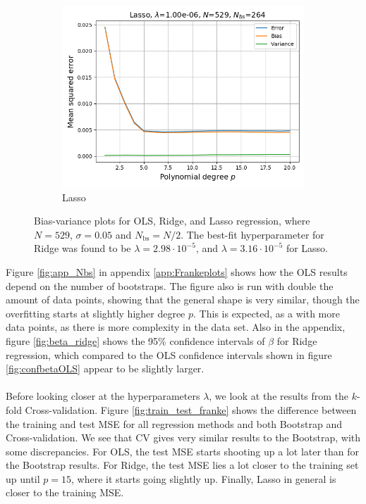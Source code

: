 \documentclass[a4paper]{article}
\begin{document}
\begin{figure}[H]
\begin{subfigure}{0.49\textwidth}
    \includegraphics[scale=0.45]{../figures/task_e/bias_variance_N529_pmax20_nlamb10_noise0.05_seed4155_Lasso_boot_Nbs264_opt1.png}
    \caption{Lasso}
  \end{subfigure}
  \caption{Bias-variance plots for OLS, Ridge, and Lasso regression, where $N=529$, $\sigma = 0.05$ and $N_{\text{bs}} = N/2$. The best-fit hyperparameter for Ridge was found to be $\lambda = 2.98\cdot10^{-5}$, and $\lambda = 3.16\cdot10^{-5}$ for Lasso.}
  \label{fig:bias_var}
\end{figure}
Figure \ref{fig:app_Nbs} in appendix \ref{app:Frankeplots} shows how the OLS results depend on the number of bootstraps. The figure also is run with double the amount of data points, showing that the general shape is very similar, though the overfitting starts at slightly higher degree $p$. This is expected, as a with more data points, as there is more complexity in the data set. Also in the appendix, figure \ref{fig:beta_ridge} shows the 95\% confidence intervals of $\beta$ for Ridge regression, which compared to the OLS confidence intervals shown in figure \ref{fig:confbetaOLS} appear to be slightly larger.\\\\
Before looking closer at the hyperparameters $\lambda$, we look at the results from the $k$-fold Cross-validation. Figure \ref{fig:train_test_franke} shows the difference between the training and test MSE for all regression methods and both Bootstrap and Cross-validation. We see that CV gives very similar results to the Bootstrap, with some discrepancies. For OLS, the test MSE starts shooting up a lot later than for the Bootstrap results. For Ridge, the test MSE lies a lot closer to the training set up until $p=15$, where it starts going slightly up. Finally, Lasso in general is closer to the training MSE.
\end{document}
